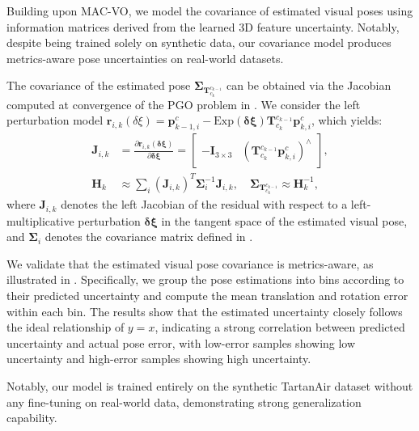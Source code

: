 Building upon MAC-VO, we model the covariance of estimated visual poses using information matrices derived from the learned 3D feature uncertainty.
Notably, despite being trained solely on synthetic data, our covariance model produces metrics-aware pose uncertainties on real-world datasets.

The covariance of the estimated pose $\bm{\Sigma}_{\mathbf{T}^{c_{k-1}}_{c_k}}$ can be obtained via the Jacobian computed at convergence of the PGO problem in . We consider the left perturbation model $\mathbf{r}_{i,k}(\delta\xi)=\mathbf{p}_{k-1, i}^{c} - \text{Exp}(\bm{\delta\xi})\mathbf{T}^{c_{k-1}}_{c_k} \mathbf{p}^{c}_{k, i}$, which yields:
\begin{equation}
\begin{aligned}
    \mathbf{J}_{i,k} &= \frac{\partial{\mathbf{r}_{i,k}(\bm{\delta\xi})}}{\partial \bm{\delta\xi}} = \begin{bmatrix} -\mathbf{I}_{3\times3} & (\mathbf{T}^{c_{k-1}}_{c_k}\mathbf{p}^c_{k,i})^{\wedge} \end{bmatrix}, \\
    \mathbf{H}_{k} &\approx \sum_i (\mathbf{J}_{i,k})^T \bm{\Sigma}_i^{-1} \mathbf{J}_{i,k}, \quad 
     \bm{\Sigma}_{\mathbf{T}^{c_{k-1}}_{c_k}} \approx \mathbf{H}_{k}^{-1},
\end{aligned}
\label{eq:maci2:pose_cov}
\end{equation}
where $\mathbf{J}_{i,k}$ denotes the left Jacobian of the residual with respect to a left-multiplicative perturbation $\bm{\delta \xi}$ in the tangent space of the estimated visual pose, and $\bm{\Sigma}_i$ denotes the covariance matrix defined in .

We validate that the estimated visual pose covariance is metrics-aware, as illustrated in . 
Specifically, we group the pose estimations into bins according to their predicted uncertainty and compute the mean translation and rotation error within each bin. 
The results show that the estimated uncertainty closely follows the ideal relationship of $y = x$, indicating a strong correlation between predicted uncertainty and actual pose error, with low-error samples showing low uncertainty and high-error samples showing high uncertainty.

Notably, our model is trained entirely on the synthetic TartanAir \cite{wang2020tartanair} dataset without any fine-tuning on real-world data, demonstrating strong generalization capability.

